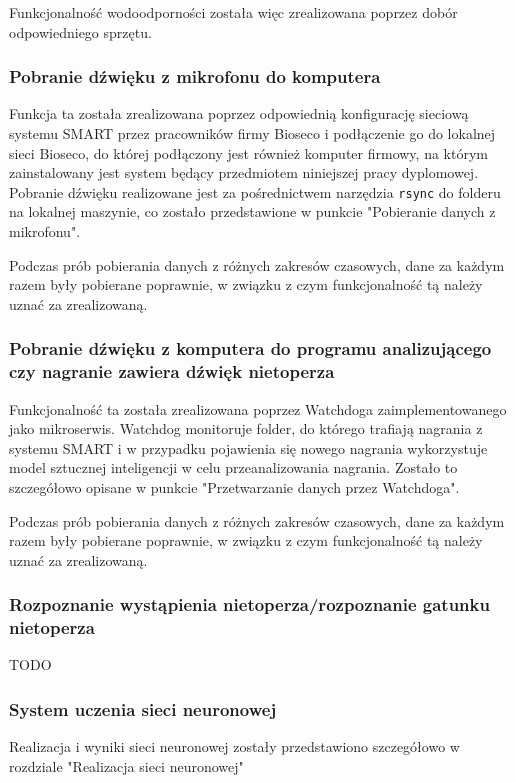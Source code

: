 \documentclass{sprz}
\begin{document}
Funkcjonalność wodoodporności została więc zrealizowana poprzez dobór odpowiedniego sprzętu.

\subsubsection{Pobranie dźwięku z mikrofonu do komputera}
Funkcja ta została zrealizowana poprzez odpowiednią konfigurację sieciową systemu SMART przez pracowników firmy Bioseco i podłączenie go do lokalnej sieci Bioseco, do której podłączony jest również komputer firmowy, na którym zainstalowany jest system będący przedmiotem niniejszej pracy dyplomowej. Pobranie dźwięku realizowane jest za pośrednictwem narzędzia \verb|rsync| do folderu na lokalnej maszynie, co zostało przedstawione w punkcie "Pobieranie danych z mikrofonu". 


Podczas prób pobierania danych z różnych zakresów czasowych, dane za każdym razem były pobierane poprawnie, w związku z czym funkcjonalność tą należy uznać za zrealizowaną.

\subsubsection{Pobranie dźwięku z komputera do programu analizującego czy nagranie zawiera dźwięk nietoperza}
Funkcjonalność ta została zrealizowana poprzez Watchdoga zaimplementowanego jako mikroserwis. Watchdog monitoruje folder, do którego trafiają nagrania z systemu SMART i w przypadku pojawienia się nowego nagrania wykorzystuje model sztucznej inteligencji w celu przeanalizowania nagrania. Zostało to szczegółowo opisane w punkcie "Przetwarzanie danych przez Watchdoga". 


Podczas prób pobierania danych z różnych zakresów czasowych, dane za każdym razem były pobierane poprawnie, w związku z czym funkcjonalność tą należy uznać za zrealizowaną.

\subsubsection{Rozpoznanie wystąpienia nietoperza/rozpoznanie gatunku nietoperza}
TODO


\subsubsection{System uczenia sieci neuronowej}
Realizacja i wyniki sieci neuronowej zostały przedstawiono szczegółowo w rozdziale "Realizacja sieci neuronowej"
\end{document}
